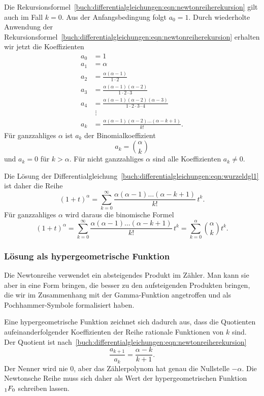 %
Die
Rekursionsformel~\eqref{buch:differentialgleichungen:eqn:newtonreiherekursion}
gilt auch im Fall $k=0$.
Aus der Anfangsbedingung folgt $a_0=1$.
Durch wiederholte Anwendung der 
Rekursionsformel~\eqref{buch:differentialgleichungen:eqn:newtonreiherekursion}
erhalten wir jetzt die Koeffizienten
\begin{align*}
a_0&=1
\\
a_1&=\alpha
\\
a_2&=\frac{\alpha(\alpha-1)}{1\cdot 2}
\\
a_3&=\frac{\alpha(\alpha-1)(\alpha-2)}{1\cdot 2\cdot 3}
\\
a_4&=\frac{\alpha(\alpha-1)(\alpha-2)(\alpha-3)}{1\cdot 2\cdot 3\cdot 4}
\\
&\;\vdots
\\
a_k&=\frac{\alpha(\alpha-1)(\alpha-2)\dots(\alpha-k+1)}{k!}.
\end{align*}
Für ganzzahliges $\alpha$ ist $a_k$ der Binomialkoeffizient
\[
a_k=\binom{\alpha}{k}
\]
und $a_k=0$ für $k>\alpha$.
Für nicht ganzzahliges $\alpha$ sind alle Koeffizienten $a_k\ne 0$.

Die Lösung der 
Differentialgleichung~\eqref{buch:differentialgleichungen:eqn:wurzeldgl1}
ist daher die Reihe
\begin{equation}
(1+t)^\alpha
=
\sum_{k=0}^\infty
\frac{\alpha(\alpha-1)\dots(\alpha-k+1)}{k!}\, t^k.
\label{buch:differentialgleichungen:eqn:newtonreihe}
\end{equation}
Für ganzzahliges $\alpha$ wird daraus die binomische Formel
\[
(1+t)^\alpha
=
\sum_{k=0}^\infty
\frac{\alpha(\alpha-1)\dots(\alpha-k+1)}{k!}\, t^k
=
\sum_{k=0}^\alpha \binom{\alpha}{k} t^k.
\]

%
%
\subsubsection{Lösung als hypergeometrische Funktion}
Die Newtonreihe verwendet ein absteigendes Produkt im Zähler.
Man kann sie aber in eine Form bringen, die besser zu den aufsteigenden
Produkten bringen, die wir im Zusammenhang mit der Gamma-Funktion
angetroffen und als Pochhammer-Symbole formalisiert haben.

Eine hypergeometrische Funktion zeichnet sich dadurch aus, dass
die Quotienten aufeinanderfolgender Koeffizienten der Reihe rationale
Funktionen von $k$ sind.
Der Quotient ist
nach~\eqref{buch:differentialgleichungen:eqn:newtonreiherekursion}
\[
\frac{a_{k+1}}{a_k}
=
\frac{\alpha-k}{k+1}.
\]
Der Nenner wird nie $0$, aber das Zählerpolynom hat genau die Nullstelle
$-\alpha$.
Die Newtonsche Reihe muss sich daher als Wert der hypergeometrischen
Funktion $\mathstrut_1F_0$ schreiben lassen.
%

